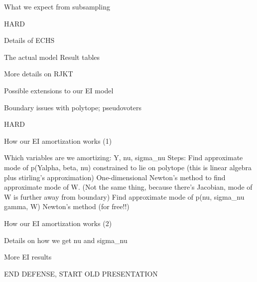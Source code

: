 \documentclass[ignorenonframetext,]{beamer}
\begin{document}
\begin{frame}{What we expect from subsampling}

HARD

\end{frame}

\begin{frame}{Details of ECHS}

The actual model Result tables

\end{frame}

\begin{frame}{More details on RJKT}

\end{frame}

\begin{frame}{Possible extensions to our EI model}

\end{frame}

\begin{frame}{Boundary issues with polytope; pseudovoters}

HARD

\end{frame}

\begin{frame}{How our EI amortization works (1)}

Which variables are we amortizing: Y, nu, sigma\_nu Steps: Find
approximate mode of p(Y\textbar{}alpha, beta, nu) constrained to lie on
polytope (this is linear algebra plus stirling's approximation)
One-dimensional Newton's method to find approximate mode of W. (Not the
same thing, because there's Jacobian, mode of W is further away from
boundary) Find approximate mode of p(nu, sigma\_nu\textbar{} gamma, W)
Newton's method (for free!!)

\end{frame}

\begin{frame}{How our EI amortization works (2)}

Details on how we get nu and sigma\_nu

\end{frame}

\begin{frame}{More EI results}

\end{frame}

\begin{frame}{END DEFENSE, START OLD PRESENTATION}

\end{frame}
\end{document}
